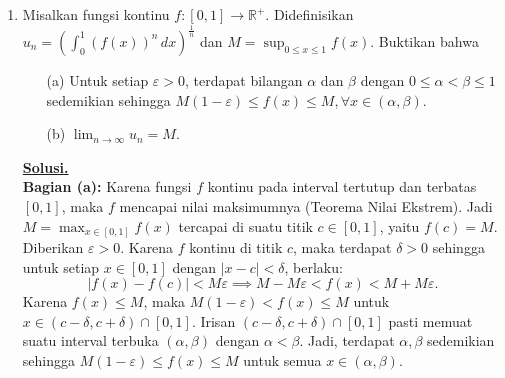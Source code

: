 \documentclass[12pt,twoside]{article}
\newenvironment{solution}
{
	\par\noindent\textbf{\underline{Solusi.}}\\
}
{
	\par
}
\begin{document}
\begin{enumerate}
\begin{solution}
          Kita akan tunjukkan dengan kontradiksi bahwa $xy$ bukan unit.
          Andaikan $xy$ adalah unit. Maka terdapat $z \in R$ sedemikian sehingga $(xy)z = 1$.
          Dengan sifat asosiatif, kita peroleh $x(yz) = 1$.
          Persamaan ini menunjukkan bahwa $x$ memiliki invers kanan, yaitu $yz$.
          Karena $R$ adalah ring berhingga, suatu unsur yang memiliki invers kanan pastilah merupakan unit.
          Jadi $x$ adalah unit.
          Namun, ini bertentangan (kontradiksi) dengan hipotesis bahwa $x$ adalah pembagi nol kiri.
          Oleh karena itu, pengandaian bahwa $xy$ adalah unit haruslah salah.

          Sehingga kita simpulkan $xy$ bukan unit.
          Mengingat $xy \neq 0$ dan $R$ berhingga, setiap unsur tak nol yang bukan unit haruslah merupakan pembagi nol (Lema Wedderburn pada Ring Berhingga).
          Lebih lanjut, dalam ring berhingga, himpunan pembagi nol kiri sama dengan himpunan pembagi nol kanan.
          Jadi, $xy$ adalah pembagi nol kiri dan sekaligus pembagi nol kanan.
        \end{solution}

  \item Misalkan fungsi kontinu $f:[0,1]\to \mathbb{R}^{+}$. Didefinisikan $u_n=\left(\displaystyle\int_{0}^{1}\left(f(x)\right)^n\,dx \right)^{\frac{1}{n}}$ dan $\displaystyle M=\sup_{0\leq x\leq 1}f(x)$. Buktikan bahwa
        \begin{enumerate}
          \item[(a)]Untuk setiap $\varepsilon>0$, terdapat bilangan $\alpha$ dan $\beta$ dengan $0\leq \alpha<\beta\leq 1$ sedemikian sehingga $M(1-\varepsilon)\leq f(x)\leq M, \forall x\in(\alpha,\beta)$.

          \item[(b)] $\displaystyle
                  \lim_{n\to\infty}u_n=M$.
        \end{enumerate}
        \begin{solution}
          \textbf{Bagian (a):}
          Karena fungsi $f$ kontinu pada interval tertutup dan terbatas $[0,1]$, maka $f$ mencapai nilai maksimumnya (Teorema Nilai Ekstrem). Jadi $M = \max_{x\in[0,1]} f(x)$ tercapai di suatu titik $c \in [0,1]$, yaitu $f(c)=M$.
          Diberikan $\varepsilon > 0$. Karena $f$ kontinu di titik $c$, maka terdapat $\delta > 0$ sehingga untuk setiap $x \in [0,1]$ dengan $|x-c| < \delta$, berlaku:
          \[ |f(x) - f(c)| < M\varepsilon \implies M - M\varepsilon < f(x) < M + M\varepsilon. \]
          Karena $f(x) \le M$, maka $M(1-\varepsilon) < f(x) \le M$ untuk $x \in (c-\delta, c+\delta) \cap [0,1]$.
          Irisan $(c-\delta, c+\delta) \cap [0,1]$ pasti memuat suatu interval terbuka $(\alpha, \beta)$ dengan $\alpha < \beta$.
          Jadi, terdapat $\alpha, \beta$ sedemikian sehingga $M(1-\varepsilon) \le f(x) \le M$ untuk semua $x \in (\alpha, \beta)$.


\end{solution}
\end{enumerate}
\end{document}
